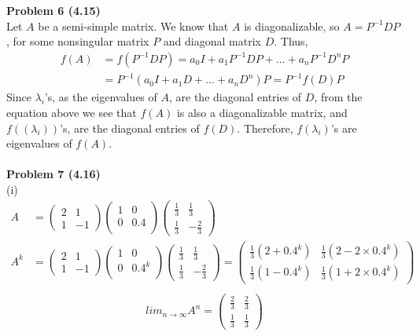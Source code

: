 \documentclass[letterpaper,12pt]{article}
\theoremstyle{definition}
\begin{document}
\noindent\textbf{Problem 6 (4.15)} \\
Let $A$ be a semi-simple matrix. We know that $A$ is diagonalizable, so $A = P^{-1} D P$, for some nonsingular matrix $P$ and diagonal matrix $D$. Thus, 
\begin{align*}
f(A) &= f(P^{-1} D P) = a_0I+a_1P^{-1}DP+...+a_nP^{-1}D^{n}P\\
&= P^{-1} (a_0I+a_1D+...+a_nD^n)P = P^{-1} f(D)P
\end{align*}
Since $\lambda_i$'s, as the eigenvalues of $A$, are the diagonal entries of $D$, from the equation above we see that $f(A)$ is also a diagonalizable matrix, and $f((\lambda_i))$'s, are the diagonal entries of $f(D)$. Therefore, $f(\lambda_i)$'s are eigenvalues of $f(A)$.\\
\\
\noindent\textbf{Problem 7 (4.16)} \\
(i)\\
\begin{align*}
A &= \begin{pmatrix}
2 & 1\\
1 & -1
\end{pmatrix}\begin{pmatrix}
1 & 0\\
0 & 0.4\\
\end{pmatrix}\begin{pmatrix}
\frac{1}{3} & \frac{1}{3}\\
\frac{1}{3} & -\frac{2}{3}
\end{pmatrix}\\
A^k &= \begin{pmatrix}
2 & 1\\
1 & -1
\end{pmatrix}\begin{pmatrix}
1 & 0\\
0 & 0.4^k\\
\end{pmatrix}\begin{pmatrix}
\frac{1}{3} & \frac{1}{3}\\
\frac{1}{3} & -\frac{2}{3}
\end{pmatrix} = \begin{pmatrix}
\frac{1}{3}(2 + 0.4^k) & \frac{1}{3}(2 - 2\times 0.4^k)\\
\frac{1}{3}(1 - 0.4^k) & \frac{1}{3}(1 + 2\times 0.4^k)
\end{pmatrix}\\
\end{align*}
\begin{align*}
lim_{n\rightarrow \infty}A^n = \begin{pmatrix}
\frac{2}{3} & \frac{2}{3}\\
\frac{1}{3} & \frac{1}{3}
\end{pmatrix}
\end{align*}
\end{document}
